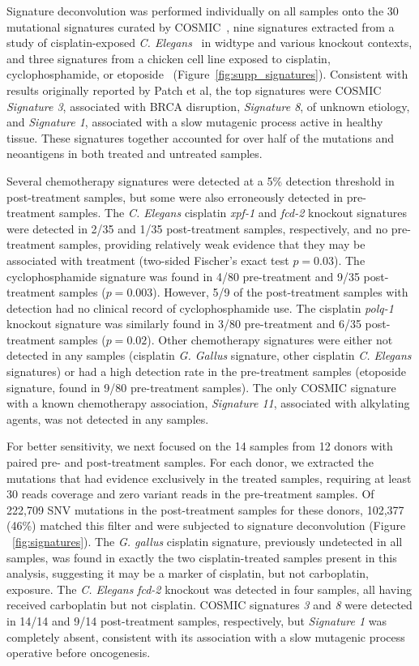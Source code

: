 Signature deconvolution was performed individually on all samples onto the 30 mutational signatures curated by COSMIC~\cite{364242}, nine signatures extracted from a study of cisplatin-exposed \textit{C. Elegans}~\cite{Meier_2014} in widtype and various knockout contexts, and three signatures from a chicken cell line exposed to cisplatin, cyclophosphamide, or etoposide~\cite{Szikriszt_2016} (Figure~\ref{fig:supp_signatures}). Consistent with results originally reported by Patch et al, the top signatures were COSMIC \textit{Signature 3}, associated with BRCA disruption, \textit{Signature 8}, of unknown etiology, and \textit{Signature 1}, associated with a slow mutagenic process active in healthy tissue. These signatures together accounted for over half of the mutations and neoantigens in both treated and untreated samples.

Several chemotherapy signatures were detected at a 5\% detection threshold in post-treatment samples, but some were also erroneously detected in pre-treatment samples. The \textit{C. Elegans} cisplatin \textit{xpf-1} and \textit{fcd-2} knockout signatures were detected in 2/35 and 1/35 post-treatment samples, respectively, and no pre-treatment samples, providing relatively weak evidence that they may be associated with treatment (two-sided Fischer's exact test $p=0.03$). The cyclophosphamide signature was found in 4/80 pre-treatment and 9/35 post-treatment samples ($p=0.003$). However, 5/9 of the post-treatment samples with detection had no clinical record of cyclophosphamide use. The cisplatin \textit{polq-1} knockout signature was similarly found in 3/80 pre-treatment and 6/35 post-treatment samples ($p=0.02$). Other chemotherapy signatures were either not detected in any samples (cisplatin \textit{G. Gallus} signature, other cisplatin \textit{C. Elegans} signatures) or had a high detection rate in the pre-treatment samples (etoposide signature, found in 9/80 pre-treatment samples). The only COSMIC signature with a known chemotherapy association, \textit{Signature 11}, associated with alkylating agents, was not detected in any samples.

For better sensitivity, we next focused on the 14 samples from 12 donors with paired pre- and post-treatment samples. For each donor, we extracted the mutations that had evidence exclusively in the treated samples, requiring at least 30 reads coverage and zero variant reads in the pre-treatment samples. Of 222,709 SNV mutations in the post-treatment samples for these donors, 102,377 (46\%) matched this filter and were subjected to signature deconvolution (Figure ~\ref{fig:signatures}). The \textit{G. gallus} cisplatin signature, previously undetected in all samples, was found in exactly the two cisplatin-treated samples present in this analysis, suggesting it may be a marker of cisplatin, but not carboplatin, exposure. The \textit{C. Elegans} \textit{fcd-2} knockout was detected in four samples, all having received carboplatin but not cisplatin. COSMIC signatures \textit{3} and \textit{8} were detected in 14/14 and 9/14 post-treatment samples, respectively, but \textit{Signature 1} was completely absent, consistent with its association with a slow mutagenic process operative before oncogenesis.

